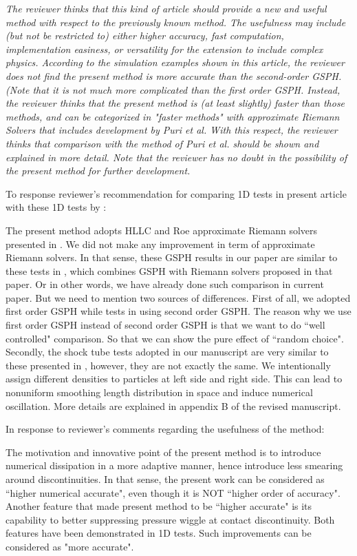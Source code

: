 \documentclass[10pt,a4paper]{article}
\begin{document}
\textit{The reviewer thinks that this kind of article should provide a new and useful method with respect to the previously known method. The usefulness may include (but not be restricted to) either higher accuracy, fast computation, implementation easiness, or versatility for the extension to include complex physics. According to the simulation examples shown in this article, the reviewer does not find the present method is more accurate than the second-order GSPH. (Note that it is not much more complicated than the first order GSPH. Instead, the reviewer thinks that the present method is (at least slightly) faster than those methods, and can be categorized in "faster methods" with approximate Riemann Solvers that includes development by Puri et al. With this respect, the reviewer thinks that comparison with the method of Puri et al. should be shown and explained in more detail. Note that the reviewer has no doubt in the
possibility of the present method for further development.}

To response reviewer's recommendation for comparing 1D tests in present article with these 1D tests by \citet{puri2014approximate}:

The present method adopts HLLC and Roe approximate Riemann solvers presented in \citep{puri2014approximate}. We did not make any improvement in term of approximate Riemann solvers. In that sense, these GSPH results in our paper are similar to these tests in \citep{puri2014approximate}, which combines GSPH with Riemann solvers proposed in that paper. Or in other words, we have already done such comparison in current paper.
But we need to mention two sources of differences. First of all, we adopted first order GSPH while tests in \citep{puri2014approximate} using second order GSPH. The reason why we use first order GSPH instead of second order GSPH is that we want to do ``well controlled" comparison. So that we can show the pure effect of ``random choice". Secondly, the shock tube tests adopted in our manuscript are very similar to these presented in \citep{puri2014approximate}, however, they are not exactly the same. We intentionally assign different densities to particles at left side and right side. This can lead to nonuniform smoothing length distribution in space and induce numerical oscillation. More details are explained in appendix B of the revised manuscript.

In response to reviewer's comments regarding the usefulness of the method:

The motivation and innovative point of the present method is to introduce numerical dissipation in a more adaptive manner, hence introduce less smearing around discontinuities. In that sense, the present work can be considered as ``higher numerical accurate", even though it is NOT ``higher order of accuracy". Another feature that made present method to be ``higher accurate" is its capability to better suppressing pressure wiggle at contact discontinuity. Both features have been demonstrated in 1D tests. Such improvements can be considered as "more accurate".
 
\end{document}
